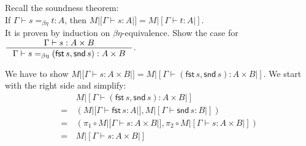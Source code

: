 \begin{exercise}
    Recall the soundness theorem:\\
    If $\Gamma \vdash s =_{\beta\eta} t : A$, then $M |[ \Gamma \vdash s: A |] = M |[ \Gamma \vdash t: A |]$.\\
    It is proven by induction on $\beta\eta$-equivalence.
    Show the case for $\inference{\Gamma \vdash s: A \times B}{\Gamma \vdash s =_{\beta\eta} (\mathsf{fst}\,s, \mathsf{snd}\,s): A \times B}$.
\end{exercise}
\begin{answer}
    We have to show $M |[ \Gamma \vdash s: A \times B |] = M |[ \Gamma \vdash (\mathsf{fst}\,s, \mathsf{snd}\,s): A \times B |]$.
    We start with the right side and simplify:
    \begin{align*}
          & M|[\Gamma \vdash (\mathsf{fst}\,s, \mathsf{snd}\,s): A \times B |]\\
        = \,& (M|[ \Gamma \vdash \mathsf{fst}\,s: A|], M|[\Gamma \vdash \mathsf{snd}\,s: B|])\\
        = \,& (\pi_1 \circ M|[ \Gamma \vdash s: A \times B |], \pi_2 \circ M|[\Gamma \vdash s: A \times B|])\\
        = \,& M|[ \Gamma \vdash s: A \times B |]
    \end{align*}
\end{answer}

